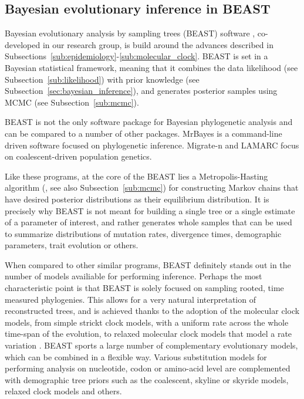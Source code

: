\subsection{Bayesian evolutionary inference in BEAST}

Bayesian evolutionary analysis by sampling trees (BEAST) software \citep{Drummond2012}, co-developed in our research group, is build around the advances described in Subsections~\ref{sub:epidemiology}-\ref{sub:molecular_clock}.
BEAST is set in a Bayesian statistical framework, meaning that it combines the data likelihood (see Subsection~\ref{sub:likelihood}) with prior knowledge (see Subsection~\ref{sec:bayesian_inference}), and generates posterior samples using MCMC (see Subsection~\ref{sub:mcmc}).

BEAST is not the only software package for Bayesian phylogenetic analysis and can be compared to a number of other packages.
MrBayes \citep{Huelsenbeck2001} is a command-line driven software focused on phylogenetic inference.
Migrate-n \citep{migrate} and LAMARC \citep{Kuhner2006} focus on coalescent-driven population genetics.

Like these programs, at the core of the BEAST lies a Metropolis-Hasting algorithm (\cite{Metropolis1953, Hasting1970}, see also Subsection~\ref{sub:mcmc}) for constructing Markov chains that have desired posterior distributions as their equilibrium distribution.
It is precisely why BEAST is not meant for building a single tree or a single estimate of a parameter of interest, and rather generates whole samples that can be used to summarize distributions of mutation rates, divergence times, demographic parameters, trait evolution or others.

When compared to other similar programs, BEAST definitely stands out in the number of models availiable for performing inference.
Perhaps the most characteristic point is that BEAST is solely focused on sampling rooted, time measured phylogenies.
This allows for a very natural interpretation of reconstructed trees, and is achieved thanks to the adoption of the molecular clock models, from simple strickt clock models, with a uniform rate across the whole time-span of the evolution, to relaxed molecular clock models that model a rate variation \citep{Thorne1998,Yoder2000,Drummond2006,Drummond2010}.
BEAST sports a large number of complementary evolutionary models, which can be combined in a flexible way.
Various substitution models for performing analysis on nucleotide, codon or amino-acid level are complemented with demographic tree priors such as the coalescent, skyline \citep{Drummond2005} or skyride \citep{Minin2008b} models, relaxed clock models and others.

